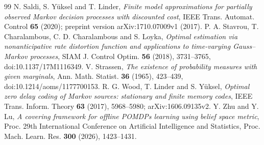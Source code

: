\begin{thebibliography}{99}
 N. Saldi, S. Y\"uksel and T. Linder, \emph{Finite model approximations for partially observed Markov decision processes with discounted cost}, IEEE Trans. Automat. Control \textbf{65} (2020); preprint version arXiv:1710.07009v1 (2017).
 P. A. Stavrou, T. Charalambous, C. D. Charalambous and S. Loyka, \emph{Optimal estimation via nonanticipative rate distortion function and applications to time-varying Gauss--Markov processes}, SIAM J. Control Optim. \textbf{56} (2018), 3731--3765, doi:10.1137/17M1116349.
 V. Strassen, \emph{The existence of probability measures with given marginals}, Ann. Math. Statist. \textbf{36} (1965), 423--439, doi:10.1214/aoms/1177700153.
 R. G. Wood, T. Linder and S. Y\"uksel, \emph{Optimal zero delay coding of Markov sources: stationary and finite memory codes}, IEEE Trans. Inform. Theory \textbf{63} (2017), 5968--5980; arXiv:1606.09135v2.
 Y. Zhu and Y. Lu, \emph{A covering framework for offline POMDPs learning using belief space metric}, Proc. 29th International Conference on Artificial Intelligence and Statistics, Proc. Mach. Learn. Res. \textbf{300} (2026), 1423--1431.
\end{thebibliography}
